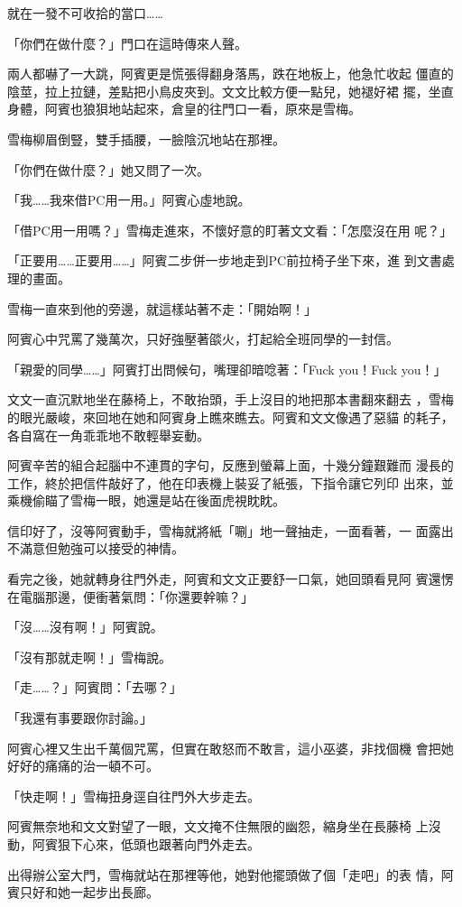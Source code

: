 就在一發不可收拾的當口……

「你們在做什麼？」門口在這時傳來人聲。

兩人都嚇了一大跳，阿賓更是慌張得翻身落馬，跌在地板上，他急忙收起
僵直的陰莖，拉上拉鏈，差點把小鳥皮夾到。文文比較方便一點兒，她褪好裙
擺，坐直身體，阿賓也狼狽地站起來，倉皇的往門口一看，原來是雪梅。

雪梅柳眉倒豎，雙手插腰，一臉陰沉地站在那裡。

「你們在做什麼？」她又問了一次。

「我……我來借PC用一用。」阿賓心虛地說。

「借PC用一用嗎？」雪梅走進來，不懷好意的盯著文文看：「怎麼沒在用
呢？」

「正要用……正要用……」阿賓二步併一步地走到PC前拉椅子坐下來，進
到文書處理的畫面。

雪梅一直來到他的旁邊，就這樣站著不走：「開始啊！」

阿賓心中咒罵了幾萬次，只好強壓著燄火，打起給全班同學的一封信。

「親愛的同學……」阿賓打出問候句，嘴理卻暗唸著：「Fuck you！Fuck
you！」

文文一直沉默地坐在藤椅上，不敢抬頭，手上沒目的地把那本書翻來翻去
，雪梅的眼光嚴峻，來回地在她和阿賓身上瞧來瞧去。阿賓和文文像遇了惡貓
的耗子，各自窩在一角乖乖地不敢輕舉妄動。

阿賓辛苦的組合起腦中不連貫的字句，反應到螢幕上面，十幾分鐘艱難而
漫長的工作，終於把信件敲好了，他在印表機上裝妥了紙張，下指令讓它列印
出來，並乘機偷瞄了雪梅一眼，她還是站在後面虎視眈眈。

信印好了，沒等阿賓動手，雪梅就將紙「唰」地一聲抽走，一面看著，一
面露出不滿意但勉強可以接受的神情。

看完之後，她就轉身往門外走，阿賓和文文正要舒一口氣，她回頭看見阿
賓還愣在電腦那邊，便衝著氣問：「你還要幹嘛？」

「沒……沒有啊！」阿賓說。

「沒有那就走啊！」雪梅說。

「走……？」阿賓問：「去哪？」

「我還有事要跟你討論。」

阿賓心裡又生出千萬個咒罵，但實在敢怒而不敢言，這小巫婆，非找個機
會把她好好的痛痛的治一頓不可。

「快走啊！」雪梅扭身逕自往門外大步走去。

阿賓無奈地和文文對望了一眼，文文掩不住無限的幽怨，縮身坐在長藤椅
上沒動，阿賓狠下心來，低頭也跟著向門外走去。

出得辦公室大門，雪梅就站在那裡等他，她對他擺頭做了個「走吧」的表
情，阿賓只好和她一起步出長廊。

